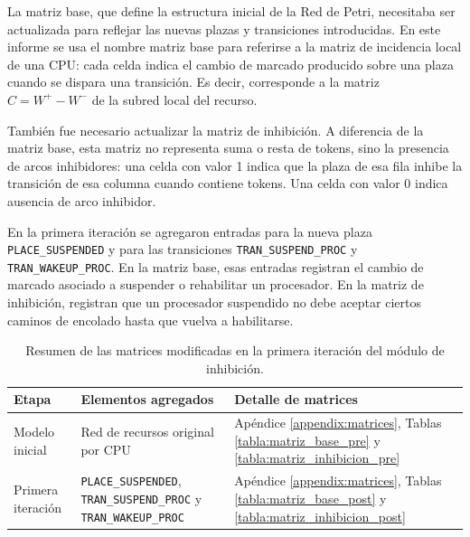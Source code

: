 La matriz base, que define la estructura inicial de la Red de Petri, necesitaba ser actualizada para reflejar las nuevas plazas y transiciones introducidas. En este informe se usa el nombre matriz base para referirse a la matriz de incidencia local de una CPU: cada celda indica el cambio de marcado producido sobre una plaza cuando se dispara una transición. Es decir, corresponde a la matriz \(C = W^{+} - W^{-}\) de la subred local del recurso.\par

También fue necesario actualizar la matriz de inhibición. A diferencia de la matriz base, esta matriz no representa suma o resta de tokens, sino la presencia de arcos inhibidores: una celda con valor 1 indica que la plaza de esa fila inhibe la transición de esa columna cuando contiene tokens. Una celda con valor 0 indica ausencia de arco inhibidor.\par

En la primera iteración se agregaron entradas para la nueva plaza \verb|PLACE_SUSPENDED| y para las transiciones \verb|TRAN_SUSPEND_PROC| y \verb|TRAN_WAKEUP_PROC|. En la matriz base, esas entradas registran el cambio de marcado asociado a suspender o rehabilitar un procesador. En la matriz de inhibición, registran que un procesador suspendido no debe aceptar ciertos caminos de encolado hasta que vuelva a habilitarse.\par

\begin{table}[H]
    \centering
    \begin{tabular}{|>{\RaggedRight\arraybackslash}p{}|>{\RaggedRight\arraybackslash}p{}|>{\RaggedRight\arraybackslash}p{}|}
        \hline
        \textbf{Etapa} & \textbf{Elementos agregados} & \textbf{Detalle de matrices} \\
        \hline
        Modelo inicial & Red de recursos original por CPU & Apéndice \ref{appendix:matrices}, Tablas \ref{tabla:matriz_base_pre} y \ref{tabla:matriz_inhibicion_pre} \\
        \hline
        Primera iteración & \verb|PLACE_SUSPENDED|, \verb|TRAN_SUSPEND_PROC| y \verb|TRAN_WAKEUP_PROC| & Apéndice \ref{appendix:matrices}, Tablas \ref{tabla:matriz_base_post} y \ref{tabla:matriz_inhibicion_post} \\
        \hline
    \end{tabular}
    \caption{Resumen de las matrices modificadas en la primera iteración del módulo de inhibición.}
    \label{tabla:resumen_matrices_primera_iteracion}
\end{table}

